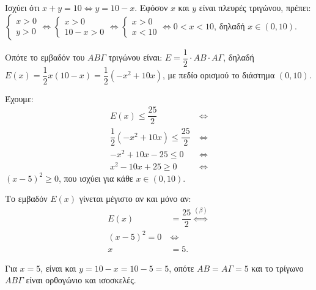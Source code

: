 
\begin{alist}
\item Ισχύει ότι $x + y = 10 \Leftrightarrow y = 10 - x$. Εφόσον $x$ και $y$ είναι πλευρές τριγώνου, πρέπει:
$\begin{cases} x > 0 \\ y > 0 \end{cases} \Leftrightarrow \begin{cases} x > 0 \\ 10 - x > 0 \end{cases} \Leftrightarrow \begin{cases} x > 0 \\ x < 10 \end{cases} \Leftrightarrow 0 < x < 10$, δηλαδή $x \in (0, 10)$.

Οπότε το εμβαδόν του $A B \Gamma$ τριγώνου είναι:
$E = \dfrac{1}{2} \cdot AB \cdot A\Gamma$, δηλαδή
$E(x) = \dfrac{1}{2} x (10 - x) = \dfrac{1}{2} (-x^2 + 10x)$, με πεδίο ορισμού το διάστημα $(0, 10)$.

\item Έχουμε:
\begin{align*}
E(x) \le \dfrac{25}{2} \ &\Leftrightarrow \\
\dfrac{1}{2} (-x^2 + 10x) \le \dfrac{25}{2} \ &\Leftrightarrow \\
-x^2 + 10x - 25 \le 0 \ &\Leftrightarrow \\
x^2 - 10x + 25 \ge 0 \ &\Leftrightarrow
\end{align*}
$(x - 5)^2 \ge 0$, που ισχύει για κάθε $x \in (0, 10)$.

\item Το εμβαδόν $E(x)$ γίνεται μέγιστο αν και μόνο αν:
\begin{align*}
E(x) &= \dfrac{25}{2} \stackrel{(\beta)}{\Leftrightarrow} \\
(x - 5)^2 = 0 \ &\Leftrightarrow \\
x &= 5.
\end{align*}

Για $x = 5$, είναι και $y = 10 - x = 10 - 5 = 5$, οπότε $AB = A\Gamma = 5$ και το τρίγωνο $A B \Gamma$ είναι
ορθογώνιο και ισοσκελές.
\end{alist}

